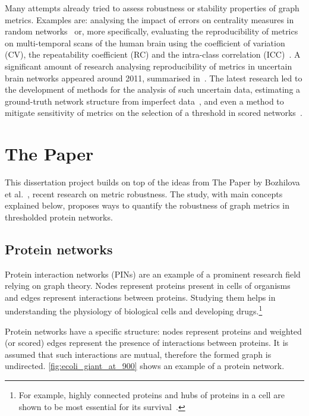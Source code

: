 Many attempts already tried to assess robustness or stability properties of graph metrics.
Examples are: analysing the impact of errors on centrality measures in random networks~\cite{BorgattiRobustnessCentralityMeasures2006} or, more specifically, evaluating the reproducibility of metrics on multi-temporal scans of the human brain using the coefficient of variation (CV), the repeatability coefficient (RC) and the intra-class correlation (ICC)~\cite{VaessenEffectReproducibilityDifferent2010,DennisTestRetestReliabilityGraph2012}.
A significant amount of research analysing reproducibility of metrics in uncertain brain networks appeared around 2011, summarised in~\cite{TelesfordExplorationGraphMetric2013}.
The latest research led to the development of methods for the analysis of such uncertain data, estimating a ground-truth network structure from imperfect data~\cite{Martin2016,Newman2018}, and even a method to mitigate sensitivity of metrics on the selection of a threshold in scored networks~\cite{Drakesmith2015}.


\section{The Paper}

This dissertation project builds on top of the ideas from The Paper by Bozhilova et al.~\cite{Bozhilova2019},  recent research on metric robustness.
The study, with main concepts explained below, proposes ways to quantify the robustness of graph metrics in thresholded protein networks.

\subsection{Protein networks}

Protein interaction networks (PINs) are an example of a prominent research field relying on graph theory.
Nodes represent proteins present in cells of organisms and edges represent interactions between proteins.
Studying them helps in understanding the physiology of biological cells and developing drugs.\footnote{For example, highly connected proteins and hubs of proteins in a cell are shown to be most essential for its survival~\cite{JeongLethalityCentralityProtein2001,HeWhyHubsTend2006}.}

Protein networks have a specific structure: nodes represent proteins and weighted (or scored) edges represent the presence of interactions between proteins.
It is assumed that such interactions are mutual, therefore the formed graph is undirected.
\cref{fig:ecoli_giant_at_900} shows an example of a protein network.

